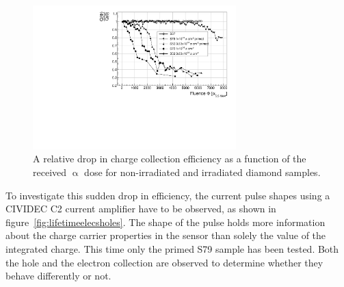 \begin{figure}[!t]
\begin{center}
\includegraphics[width=0.7\textwidth]{03_measurement_results/scripts/plots/amplvstimecx4}
\caption{A relative drop in charge collection efficiency as a function of the received $\upalpha$ dose for non-irradiated and irradiated diamond samples.}
\label{fig:longtermcx}
\end{center}
\end{figure}



To investigate this sudden drop in efficiency, the current pulse shapes using a CIVIDEC C2 current amplifier have to be observed, as shown in figure~\ref{fig:lifetimeelecsholes}. The shape of the pulse holds more information about the charge carrier properties in the sensor than solely the value of the integrated charge. This time only the primed S79 sample has been tested. Both the hole and the electron collection are observed to determine whether they behave differently or not. 

